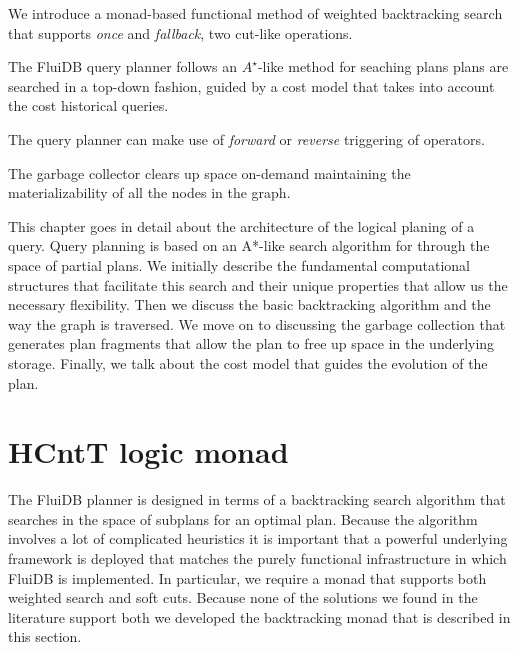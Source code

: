 
\begin{summary}
\item We introduce a monad-based functional method of weighted
  backtracking search that supports \emph{once} and \emph{fallback},
  two cut-like operations.
\item The FluiDB query planner follows an \(A^{\star}\)-like method for
  seaching plans plans are searched in a top-down fashion, guided by a
  cost model that takes into account the cost historical queries.
\item The query planner can make use of \emph{forward} or
  \emph{reverse} triggering of operators.
\item The garbage collector clears up space on-demand maintaining the
  materializability of all the nodes in the graph.
\end{summary}

This chapter goes in detail about the architecture of the logical
planing of a query. Query planning is based on an A*-like search
algorithm for through the space of partial plans. We initially
describe the fundamental computational structures that facilitate this
search and their unique properties that allow us the necessary
flexibility. Then we discuss the basic backtracking algorithm and the
way the graph is traversed. We move on to discussing the garbage
collection that generates plan fragments that allow the plan to free
up space in the underlying storage. Finally, we talk about the cost
model that guides the evolution of the plan.

\section{HCntT logic monad}

The FluiDB planner is designed in terms of a backtracking search
algorithm that searches in the space of subplans for an optimal
plan. Because the algorithm involves a lot of complicated heuristics
it is important that a powerful underlying framework is deployed that
matches the purely functional infrastructure in which FluiDB is
implemented.  In particular, we require a monad that supports both
weighted search and soft cuts. Because none of the solutions we found
in the literature support both we developed the 
backtracking monad that is described in this section.

